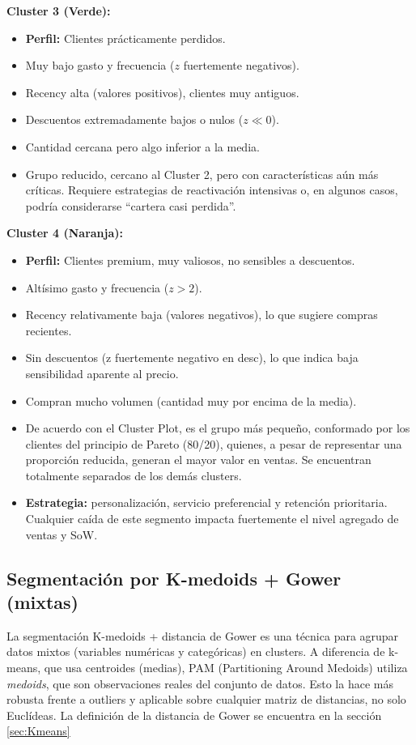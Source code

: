 \textbf{Cluster 3 (Verde):}
\begin{itemize}
\item \textbf{Perfil:} Clientes prácticamente perdidos.
\item Muy bajo gasto y frecuencia (\(z\) fuertemente negativos).
\item Recency alta (valores positivos), clientes muy antiguos.
\item Descuentos extremadamente bajos o nulos (\(z \ll 0\)).
\item Cantidad cercana pero algo inferior a la media.
\item Grupo reducido, cercano al Cluster 2, pero con características aún más críticas. Requiere estrategias de reactivación intensivas o, en algunos casos, podría considerarse “cartera casi perdida”.
\end{itemize}

\textbf{Cluster 4 (Naranja):}
\begin{itemize}
\item \textbf{Perfil:} Clientes premium, muy valiosos, no sensibles a descuentos.
\item Altísimo gasto y frecuencia (\(z > 2\)).
\item Recency relativamente baja (valores negativos), lo que sugiere compras recientes.
\item Sin descuentos (z fuertemente negativo en desc), lo que indica baja sensibilidad aparente al precio.
\item Compran mucho volumen (cantidad muy por encima de la media).
\item De acuerdo con el Cluster Plot, es el grupo más pequeño, conformado por los clientes del principio de Pareto (80/20), quienes, a pesar de representar una proporción reducida, generan el mayor valor en ventas. Se encuentran totalmente separados de los demás clusters.
\item \textbf{Estrategia:} personalización, servicio preferencial y retención prioritaria. Cualquier caída de este segmento impacta fuertemente el nivel agregado de ventas y SoW.
\end{itemize}
\newpage

\subsection{Segmentación por K-medoids + Gower (mixtas)}

La segmentación K-medoids + distancia de Gower es una técnica para agrupar datos mixtos (variables numéricas y categóricas) en clusters. A diferencia de k-means, que usa centroides (medias), PAM (Partitioning Around Medoids) utiliza \emph{medoids}, que son observaciones reales del conjunto de datos. Esto la hace más robusta frente a outliers y aplicable sobre cualquier matriz de distancias, no solo Euclídeas. La definición de la distancia de Gower se encuentra en la sección \ref{sec:Kmeans}
 
